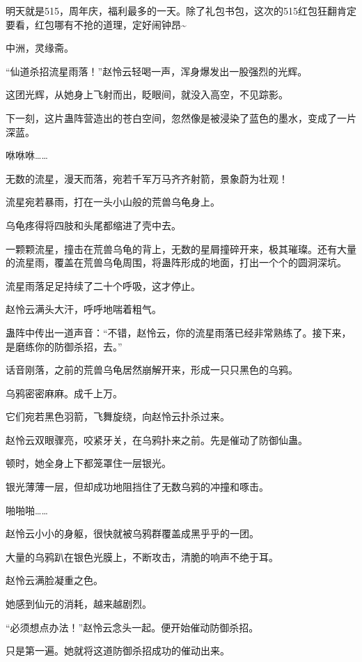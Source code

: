 
\begin{this_body}

明天就是515，周年庆，福利最多的一天。除了礼包书包，这次的515红包狂翻肯定要看，红包哪有不抢的道理，定好闹钟昂\~{}

中洲，灵缘斋。

“仙道杀招流星雨落！”赵怜云轻喝一声，浑身爆发出一股强烈的光辉。

这团光辉，从她身上飞射而出，眨眼间，就没入高空，不见踪影。

下一刻，这片蛊阵营造出的苍白空间，忽然像是被浸染了蓝色的墨水，变成了一片深蓝。

咻咻咻……

无数的流星，漫天而落，宛若千军万马齐齐射箭，景象蔚为壮观！

流星宛若暴雨，打在一头小山般的荒兽乌龟身上。

乌龟疼得将四肢和头尾都缩进了壳中去。

一颗颗流星，撞击在荒兽乌龟的背上，无数的星屑撞碎开来，极其璀璨。还有大量的流星雨，覆盖在荒兽乌龟周围，将蛊阵形成的地面，打出一个个的圆洞深坑。

流星雨落足足持续了二十个呼吸，这才停止。

赵怜云满头大汗，呼呼地喘着粗气。

蛊阵中传出一道声音：“不错，赵怜云，你的流星雨落已经非常熟练了。接下来，是磨练你的防御杀招，去。”

话音刚落，之前的荒兽乌龟居然崩解开来，形成一只只黑色的乌鸦。

乌鸦密密麻麻。成千上万。

它们宛若黑色羽箭，飞舞旋绕，向赵怜云扑杀过来。

赵怜云双眼骤亮，咬紧牙关，在乌鸦扑来之前。先是催动了防御仙蛊。

顿时，她全身上下都笼罩住一层银光。

银光薄薄一层，但却成功地阻挡住了无数乌鸦的冲撞和啄击。

啪啪啪……

赵怜云小小的身躯，很快就被乌鸦群覆盖成黑乎乎的一团。

大量的乌鸦趴在银色光膜上，不断攻击，清脆的响声不绝于耳。

赵怜云满脸凝重之色。

她感到仙元的消耗，越来越剧烈。

“必须想点办法！”赵怜云念头一起。便开始催动防御杀招。

只是第一遍。她就将这道防御杀招成功的催动出来。


\end{this_body}
